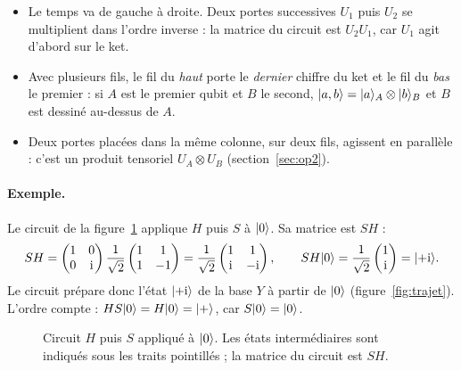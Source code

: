 \begin{remarque}
\begin{itemize}[nosep]
  \item Le temps va de gauche à droite. Deux portes successives $U_1$ puis $U_2$ se multiplient
        dans l'ordre inverse : la matrice du circuit est $U_2U_1$, car $U_1$ agit d'abord sur le ket.
  \item Avec plusieurs fils, le fil du \emph{haut} porte le \emph{dernier} chiffre du ket et le
        fil du \emph{bas} le premier : si $A$ est le premier qubit et $B$ le second,
        $|a,b\rangle=|a\rangle_A\otimes|b\rangle_B$ et $B$ est dessiné au-dessus de $A$.
  \item Deux portes placées dans la même colonne, sur deux fils, agissent en parallèle : c'est un
        produit tensoriel $U_A\otimes U_B$ (section~\ref{sec:op2}).
\end{itemize}
\end{remarque}

\paragraph{Exemple.} Le circuit de la figure~\ref{fig:circuit-hs} applique $H$ puis $S$ à
$|0\rangle$. Sa matrice est $SH$ :
\[
  SH=\begin{pmatrix}1&0\\0&\mathrm{i}\end{pmatrix}\frac{1}{\sqrt2}\begin{pmatrix}1&1\\1&-1\end{pmatrix}
  =\frac{1}{\sqrt2}\begin{pmatrix}1&1\\ \mathrm{i}&-\mathrm{i}\end{pmatrix},
  \qquad
  SH|0\rangle=\frac{1}{\sqrt2}\begin{pmatrix}1\\ \mathrm{i}\end{pmatrix}=|{+}\mathrm{i}\rangle.
\]
Le circuit prépare donc l'état $|{+}\mathrm{i}\rangle$ de la base $Y$ à partir de $|0\rangle$
(figure~\ref{fig:trajet}). L'ordre compte : $HS|0\rangle=H|0\rangle=|+\rangle$, car $S|0\rangle=|0\rangle$.

\begin{figure}[!ht]
\centering
{}
\caption{Circuit $H$ puis $S$ appliqué à $|0\rangle$. Les états intermédiaires sont indiqués sous
les traits pointillés ; la matrice du circuit est $SH$.}
\label{fig:circuit-hs}
\end{figure}


